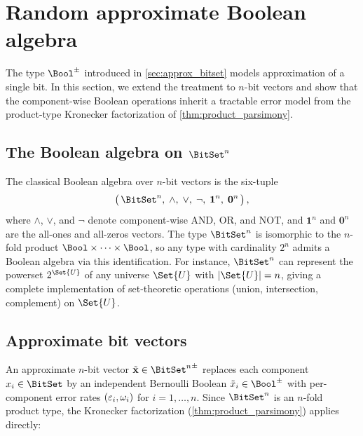 \documentclass[ ../main.tex]{subfiles}
\begin{document}
\section{Random approximate Boolean algebra}
\label{sec:bernoulli_boolean_algebra}

The type $\AT{\Bool}$ introduced in \cref{sec:approx_bitset} models approximation of a single bit.
In this section, we extend the treatment to $n$-bit vectors and show that the
component-wise Boolean operations inherit a tractable error model from the
product-type Kronecker factorization of \cref{thm:product_parsimony}.

\subsection{The Boolean algebra on \texorpdfstring{$\BitSet^n$}{B\^{}n}}

The classical Boolean algebra over $n$-bit vectors is the six-tuple
\begin{equation}
\label{eq:bool_algebra}
	\bigl(\,\BitSet^n,\;\wedge,\;\vee,\;\neg,\;\mathbf{1}^n,\;\mathbf{0}^n\,\bigr)\,,
\end{equation}
where $\wedge$, $\vee$, and $\neg$ denote component-wise AND, OR, and NOT,
and $\mathbf{1}^n$ and $\mathbf{0}^n$ are the all-ones and all-zeros vectors.
The type $\BitSet^n$ is isomorphic to the $n$-fold product $\Bool \times \cdots \times \Bool$,
so any type with cardinality $2^n$ admits a Boolean algebra via this identification.
For instance, $\BitSet^n$ can represent the powerset $2^{\Set{U}}$ of any universe
$\Set{U}$ with $|\Set{U}| = n$, giving a complete implementation of set-theoretic
operations (union, intersection, complement) on $\Set{U}$.

\subsection{Approximate bit vectors}

An approximate $n$-bit vector $\tilde{\mathbf{x}} \in \AT{\BitSet^n}$ replaces each
component $x_i \in \BitSet$ by an independent Bernoulli Boolean
$\tilde{x}_i \in \AT{\Bool}$ with per-component error rates
$(\varepsilon_i, \omega_i)$ for $i = 1, \ldots, n$.
Since $\BitSet^n$ is an $n$-fold product type, the Kronecker factorization
(\cref{thm:product_parsimony}) applies directly:
\end{document}
